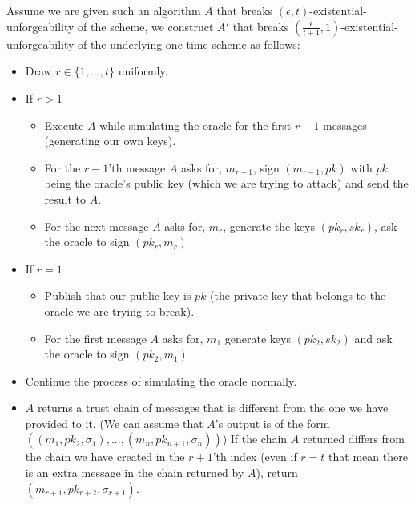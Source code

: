 \documentclass{article}
\begin{document}
\section{}%
Assume we are given such an algorithm $A$ that breaks $(\epsilon,t)$-existential-unforgeability of the scheme, we construct $A'$ that breaks $(\frac{\epsilon}{t+1}, 1)$-existential- unforgeability of the underlying one-time scheme as follows:\\
\begin{itemize}
\item Draw $r\in\{1,...,t\}$ uniformly.
\item If $r>1$
\begin{itemize}
\item Execute $A$ while simulating the oracle for the first $r-1$ messages (generating our own keys).
\item For the $r-1$'th message $A$ asks for, $m_{r-1}$, sign $(m_{r-1}, pk)$ with $pk$ being the oracle's public key (which we are trying to attack) and send the result to $A$.
\item For the next message $A$ asks for, $m_r$, generate the keys $(pk_r, sk_r)$, ask the oracle to sign $(pk_r, m_r)$
\end{itemize}
\item If $r=1$
\begin{itemize}
\item Publish that our public key is $pk$ (the private key that belongs to the oracle we are trying to break).
\item For the first message $A$ asks for, $m_1$ generate keys $(pk_2, sk_2)$ and ask the oracle to sign $(pk_2, m_1 )$
\end{itemize}

\item Continue the process of simulating the oracle normally.
\item $A$ returns a trust chain of messages that is different from the one we have provided to it. (We can assume that $A$'s output is of the form $((m_1, pk_2, \sigma_1),..., (m_n, pk_{n+1}, \sigma_n))$)
If the chain $A$ returned differs from the chain we have created in the $r+1$'th index (even if $r=t$ that mean there is an extra message in the chain returned by $A$), return $(m_{r+1}, pk_{r+2}, \sigma_{r+1})$.

\end{itemize}
\end{document}
